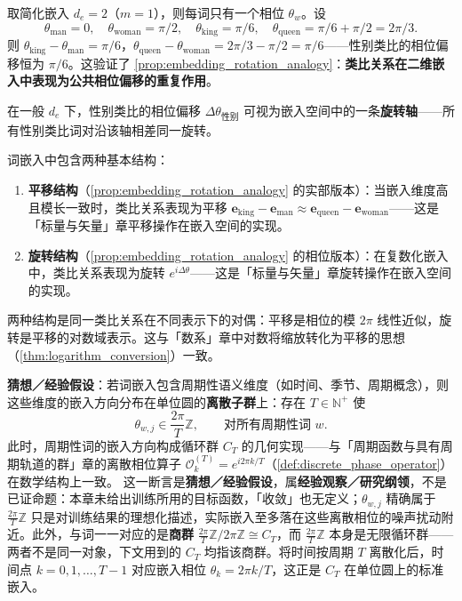 \begin{example}[性别类比的相位解释]\label{ex:gender_analogy_phase}
取简化嵌入 $d_e=2$（$m=1$），则每词只有一个相位 $\theta_w$。设
\[
\theta_{\text{man}}=0,\quad\theta_{\text{woman}}=\pi/2,\quad\theta_{\text{king}}=\pi/6,\quad\theta_{\text{queen}}=\pi/6+\pi/2=2\pi/3.
\]
则 $\theta_{\text{king}}-\theta_{\text{man}}=\pi/6$，$\theta_{\text{queen}}-\theta_{\text{woman}}=2\pi/3-\pi/2=\pi/6$——性别类比的相位偏移恒为 $\pi/6$。这验证了 \cref{prop:embedding_rotation_analogy}：\textbf{类比关系在二维嵌入中表现为公共相位偏移的重复作用}。

在一般 $d_e$ 下，性别类比的相位偏移 $\Delta\theta_{\text{性别}}$ 可视为嵌入空间中的一条\textbf{旋转轴}——所有性别类比词对沿该轴相差同一旋转。
\end{example}

\begin{remark}\label{rem:embedding_translation_rotation}
词嵌入中包含两种基本结构：
\begin{enumerate}[label=(\roman*)]
    \item \textbf{平移结构}（\cref{prop:embedding_rotation_analogy} 的实部版本）：当嵌入维度高且模长一致时，类比关系表现为平移 $\mathbf{e}_{\text{king}}-\mathbf{e}_{\text{man}}\approx\mathbf{e}_{\text{queen}}-\mathbf{e}_{\text{woman}}$——这是「标量与矢量」章平移操作在嵌入空间的实现。
    \item \textbf{旋转结构}（\cref{prop:embedding_rotation_analogy} 的相位版本）：在复数化嵌入中，类比关系表现为旋转 $e^{i\Delta\theta}$——这是「标量与矢量」章旋转操作在嵌入空间的实现。
\end{enumerate}
两种结构是同一类比关系在不同表示下的对偶：平移是相位的模 $2\pi$ 线性近似，旋转是平移的对数域表示。这与「数系」章中对数将缩放转化为平移的思想（\cref{thm:logarithm_conversion}）一致。
\end{remark}

\begin{remark}\label{prop:embedding_periodicity_generation}
\textbf{猜想／经验假设}：若词嵌入包含周期性语义维度（如时间、季节、周期概念），则这些维度的嵌入方向分布在单位圆的\textbf{离散子群}上：存在 $T\in\mathbb{N}^+$ 使
\[
\theta_{w,j}\in\frac{2\pi}{T}\mathbb{Z},\qquad \text{对所有周期性词 }w.
\]
此时，周期性词的嵌入方向构成循环群 $C_T$ 的几何实现——与「周期函数与具有周期轨道的群」章的离散相位算子 $\mathcal{O}_k^{(T)}=e^{i2\pi k/T}$（\cref{def:discrete_phase_operator}）在数学结构上一致。
这一断言是\textbf{猜想／经验假设}，属\textbf{经验观察／研究纲领}，不是已证命题：本章未给出训练所用的目标函数，「收敛」也无定义；$\theta_{w,j}$ 精确属于 $\frac{2\pi}{T}\mathbb Z$ 只是对训练结果的理想化描述，实际嵌入至多落在这些离散相位的噪声扰动附近。此外，与词一一对应的是\textbf{商群} $\frac{2\pi}{T}\mathbb{Z}\big/2\pi\mathbb{Z}\cong C_T$，而 $\frac{2\pi}{T}\mathbb{Z}$ 本身是无限循环群——两者不是同一对象，下文用到的 $C_T$ 均指该商群。将时间按周期 $T$ 离散化后，时间点 $k=0,1,\dots,T-1$ 对应嵌入相位 $\theta_k=2\pi k/T$，这正是 $C_T$ 在单位圆上的标准嵌入。
\end{remark}

